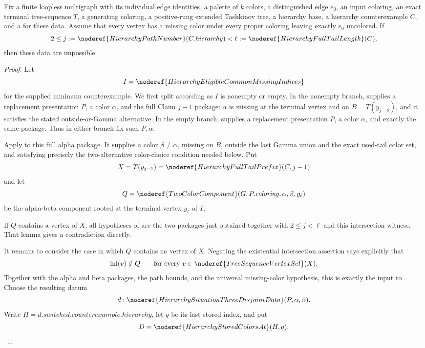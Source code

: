 \begin{lemma}
Fix a finite loopless multigraph with its individual edge identities, a
palette of \(k\) colors, a distinguished edge \(e_0\), an input coloring,
an exact terminal tree-sequence \(T\), a generating coloring, a
positive-rung extended Tashkinov tree, a hierarchy base, a hierarchy
counterexample \(C\), and a
 for these data.  Assume
that every vertex has a missing color under every proper coloring leaving
exactly \(e_0\) uncolored.  If
\[
 2\le j:=\noderef{HierarchyPathNumber}(C.\mathit{hierarchy})
   <\ell:=\noderef{HierarchyFullTailLength}(C),
\]
then these data are impossible.
\end{lemma}
\begin{proof}
Let
\[
 I=\noderef{HierarchyEligibleCommonMissingIndices}
\]
for the supplied minimum counterexample.  We first split according as
\(I\) is nonempty or empty.  In the nonempty branch,
 supplies a
replacement presentation \(P\), a color \(\alpha\), and the full Claim
\(j-1\) package: \(\alpha\) is missing at the terminal vertex and on
\(B=T(y_{j-2})\), and it satisfies the stated outside-or-Gamma
alternative.  In the empty branch,
 supplies a
replacement presentation \(P\), a color \(\alpha\), and exactly the same
package.  Thus in either branch fix such \(P,\alpha\).

Apply  to this full alpha
package.  It supplies a color \(\beta\ne\alpha\), missing on \(B\),
outside the last Gamma union and the exact used-tail color set, and
satisfying precisely the two-alternative color-choice condition needed
below.  Put
\[
 X=T(y_{j-1})=\noderef{HierarchyFullTailPrefix}(C,j-1)
\]
and let
\[
 Q=\noderef{TwoColorComponent}
   (G,P.\mathit{coloring},\alpha,\beta,y_\ell)
\]
be the alpha-beta component rooted at the terminal vertex \(y_\ell\) of
\(T\).

If \(Q\) contains a vertex of \(X\), all hypotheses of
 are the
two packages just obtained together with \(2\le j<\ell\) and this
intersection witness.  That lemma gives a contradiction directly.

It remains to consider the case in which \(Q\) contains no vertex of
\(X\).  Negating the existential intersection assertion says explicitly
that
\[
  \operatorname{inl}(v)\notin Q
       \qquad\text{for every }
       v\in\noderef{TreeSequenceVertexSet}(X).
\]
Together with the alpha and beta packages, the path bounds, and the
universal missing-color hypothesis, this is exactly the input to
.  Choose the
resulting datum
\[
 d:\noderef{HierarchySituationThreeDisjointData}(P,\alpha,\beta).
\]
Write \(H=d.\mathit{switched.counterexample.hierarchy}\), let \(q\) be
its last stored index, and put
\[
 D=\noderef{HierarchyStoredColorsAt}(H,q).
\]


\end{proof}
